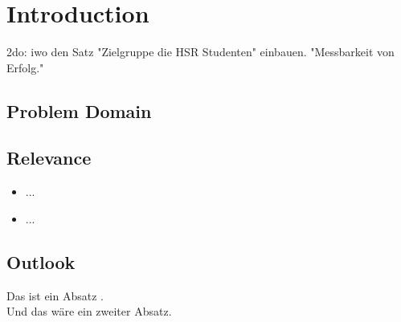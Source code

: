 \section{Introduction}
2do: iwo den Satz "Zielgruppe die HSR Studenten" einbauen. "Messbarkeit von Erfolg."

\subsection{Problem Domain}

\subsection{Relevance}
\begin{itemize}
    \item ...
    \item ...
\end{itemize}

\subsection{Outlook}
Das ist ein Absatz \cite{ba}. \\

Und das wäre ein zweiter Absatz. \cite{ba}
